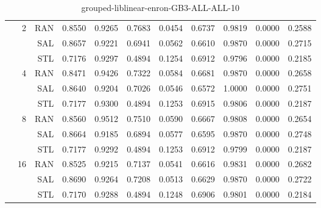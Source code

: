 \begin{center}
\begin{table}[htbp]
\begin{center}
\begin{tabular}{ | r | r | r | r | r | r | r | r | r | r | r |}
 & \multirow{3}{*}{2} & RAN & 0.8550 & 0.9265 & 0.7683 & 0.0454 & 0.6737 & 0.9819 & 0.0000 & 0.2588\\ \cline{3-11}
 &   & SAL & 0.8657 & 0.9221 & 0.6941 & 0.0562 & 0.6610 & 0.9870 & 0.0000 & 0.2715\\ \cline{3-11}
 &   & STL & 0.7176 & 0.9297 & 0.4894 & 0.1254 & 0.6912 & 0.9796 & 0.0000 & 0.2185\\ \cline{2-11}
 & \multirow{3}{*}{4} & RAN & 0.8471 & 0.9426 & 0.7322 & 0.0584 & 0.6681 & 0.9870 & 0.0000 & 0.2658\\ \cline{3-11}
 &   & SAL & 0.8640 & 0.9204 & 0.7026 & 0.0546 & 0.6572 & 1.0000 & 0.0000 & 0.2751\\ \cline{3-11}
 &   & STL & 0.7177 & 0.9300 & 0.4894 & 0.1253 & 0.6915 & 0.9806 & 0.0000 & 0.2187\\ \cline{2-11}
 & \multirow{3}{*}{8} & RAN & 0.8560 & 0.9512 & 0.7510 & 0.0590 & 0.6667 & 0.9808 & 0.0000 & 0.2654\\ \cline{3-11}
 &   & SAL & 0.8664 & 0.9185 & 0.6894 & 0.0577 & 0.6595 & 0.9870 & 0.0000 & 0.2748\\ \cline{3-11}
 &   & STL & 0.7177 & 0.9292 & 0.4894 & 0.1253 & 0.6912 & 0.9799 & 0.0000 & 0.2187\\ \cline{2-11}
 & \multirow{3}{*}{16} & RAN & 0.8525 & 0.9215 & 0.7137 & 0.0541 & 0.6616 & 0.9831 & 0.0000 & 0.2682\\ \cline{3-11}
 &   & SAL & 0.8690 & 0.9264 & 0.7208 & 0.0513 & 0.6629 & 0.9870 & 0.0000 & 0.2722\\ \cline{3-11}
 &   & STL & 0.7170 & 0.9288 & 0.4894 & 0.1248 & 0.6906 & 0.9801 & 0.0000 & 0.2184\\ \cline{2-11}
\hline
\end{tabular}
\caption{grouped-liblinear-enron-GB3-ALL-ALL-10}
\end{center}
 \end{table}
\end{center}

